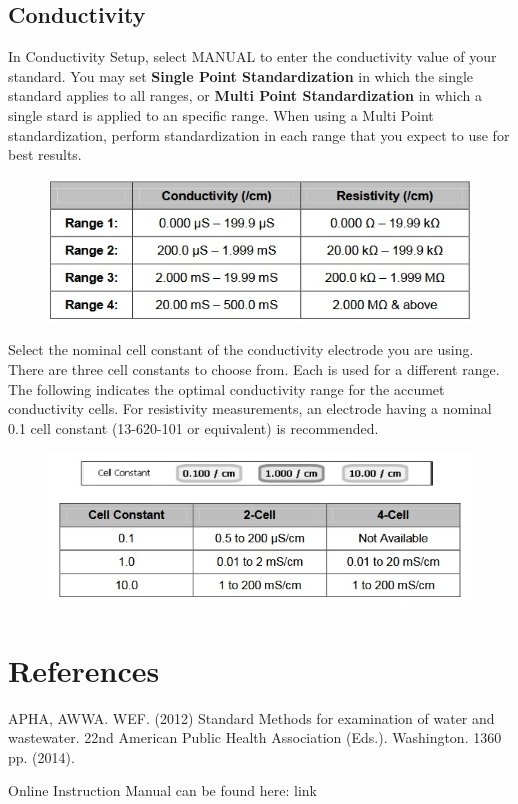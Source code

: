 \documentclass[12pt]{../SOP3}\usepackage[]{graphicx}\usepackage[]{color}
\begin{document}
\subsection{Conductivity}

\NP In Conductivity Setup, select MANUAL to enter the conductivity value of your standard. You may set \textbf{Single Point Standardization} in which the single standard applies to all ranges, or \textbf{Multi Point Standardization} in which a single stard is applied to an specific range. When using a Multi Point standardization, perform standardization in each range that you expect to use for best results.
\begin{figure}
\includegraphics{Conducivityranges.jpg}
\end{figure}
 Select the nominal cell constant of the conductivity electrode you are using. There are three cell constants to choose from. Each is used for a different range. The following indicates the optimal conductivity range for the accumet conductivity cells. For resistivity measurements, an electrode having a nominal 0.1 cell constant (13-620-101 or equivalent) is recommended.
\begin{figure}
\includegraphics{CellConstant.jpg}
\end{figure}
\section{References}

\NP APHA, AWWA. WEF. (2012) Standard Methods for examination of water and wastewater. 22nd American Public Health Association (Eds.). Washington. 1360 pp. (2014).

\NP Online Instruction Manual can be found here: link
\end{document}
